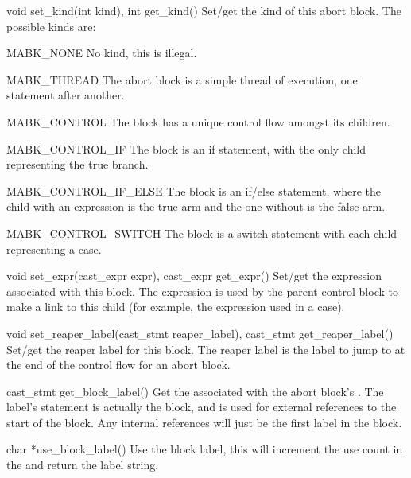 \begin{cprototypelist}
  \item[void set_kind(int kind), int get_kind()] Set/get the kind
  of this abort block.  The possible kinds are:

  \begin{cidentifierlist}
    \item[MABK_NONE] No kind, this is illegal.

    \item[MABK_THREAD] The abort block is a simple thread of
    execution, one statement after another.

    \item[MABK_CONTROL] The block has a unique control flow
    amongst its children.

    \item[MABK_CONTROL_IF] The block is an if statement, with the
    only child representing the true branch.

    \item[MABK_CONTROL_IF_ELSE] The block is an if/else statement,
    where the child with an expression is the true arm and the one without is
    the false arm.

    \item[MABK_CONTROL_SWITCH] The block is a switch statement
    with each child representing a case.
  \end{cidentifierlist}

  \item[void set_expr(cast_expr expr), cast_expr get_expr()]
  Set/get the expression associated with this block.  The expression is used
  by the parent control block to make a link to this child (for example, the
  expression used in a case).

  \item[void set_reaper_label(cast_stmt reaper_label), cast_stmt
  get_reaper_label()] Set/get the reaper label for this block.  The reaper
  label is the label to jump to at the end of the control flow for an abort
  block.

  \item[cast_stmt get_block_label()] Get the 
  associated with the abort block's .  The label's statement
  is actually the block, and is used for external references to the start of
  the block.  Any internal references will just be the first label in the
  block.

  \item[char *use_block_label()] Use the block label, this will increment the
  use count in the  and return the label string.


\end{cprototypelist}
